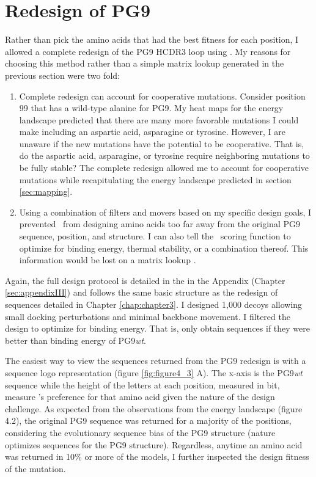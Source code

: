 \section{Redesign of PG9}
Rather than pick the amino acids that had the best fitness for each position, I allowed a complete redesign of the PG9 HCDR3 loop using \rosettadesign. My reasons for choosing this method rather than a simple matrix lookup generated in the previous section were two fold:
\begin{enumerate}
\item Complete redesign can account for cooperative mutations. Consider position 99 that has a wild-type alanine for PG9. My heat maps for the energy landscape predicted that there are many more favorable mutations I could make including an aspartic acid, asparagine or tyrosine. However, I are unaware if the new mutations have the potential to be cooperative. That is, do the aspartic acid, asparagine, or tyrosine require neighboring mutations to be fully stable? The complete redesign allowed me to account for cooperative mutations while recapitulating the energy landscape predicted in section \ref{sec:mapping}.
\item Using a combination of filters and movers based on my specific design goals, I prevented \rosetta~from designing amino acids too far away from the original PG9 sequence, position, and structure. I can also tell the \rosetta~scoring function to optimize for binding energy, thermal stability, or a combination thereof. This information would be lost on a matrix lookup \citep{Fleishman:2011ji,Kaufmann:2010ea,Kuhlman:2000tc}.
\end{enumerate}

Again, the full design protocol is detailed in the in the Appendix (Chapter \ref{sec:appendixIII}) and follows the same basic structure as the redesign of sequences detailed in Chapter \ref{chap:chapter3}. I designed 1,000 decoys allowing small docking perturbations and minimal backbone movement. I filtered the design to optimize for binding energy. That is, only obtain sequences if they were better than binding energy of PG9\textit{wt}.

The easiest way to view the sequences returned from the PG9 redesign is with a sequence logo representation (figure \ref{fig:figure4_3} A). The x-axis is the PG9\textit{wt} sequence while the height of the letters at each position, measured in bit, measure \rosetta's preference for that amino acid given the nature of the design challenge. As expected from the observations from the energy landscape (figure 4.2), the original PG9 sequence was returned for a majority of the positions, considering the evolutionary sequence bias of the PG9 structure (nature optimizes sequences for the PG9 structure).  Regardless, anytime an amino acid was returned in 10\% or more of the models, I further inspected the design fitness of the mutation.

